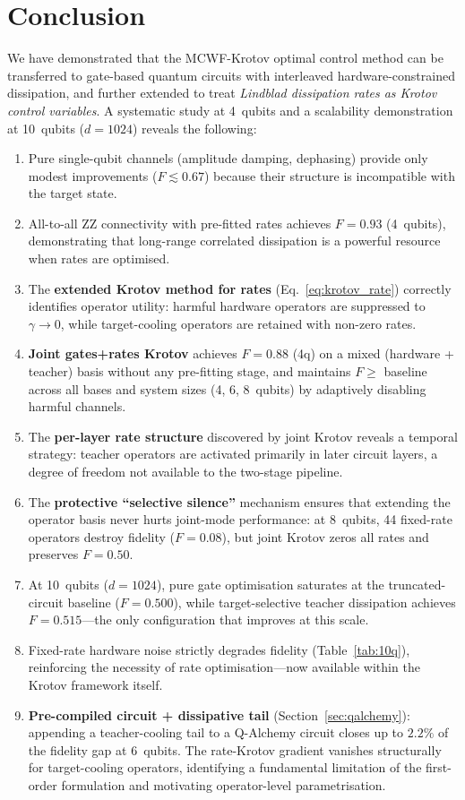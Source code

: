 \documentclass[11pt,a4paper]{article}
\begin{document}
\section{Conclusion}

We have demonstrated that the MCWF-Krotov optimal control method can
be transferred to gate-based quantum circuits with interleaved
hardware-constrained dissipation, and further extended to treat
\emph{Lindblad dissipation rates as Krotov control variables}.
A systematic study at 4~qubits and a scalability demonstration at
10~qubits ($d = 1024$) reveals the following:

\begin{enumerate}[nosep]
\item Pure single-qubit channels (amplitude damping, dephasing) provide
  only modest improvements ($F \lesssim 0.67$) because their structure
  is incompatible with the target state.
\item All-to-all ZZ connectivity with pre-fitted rates achieves
  $F = 0.93$ (4~qubits), demonstrating that long-range correlated
  dissipation is a powerful resource when rates are optimised.
\item The \textbf{extended Krotov method for rates}
  (Eq.~\ref{eq:krotov_rate}) correctly identifies operator utility:
  harmful hardware operators are suppressed to $\gamma \to 0$, while
  target-cooling operators are retained with non-zero rates.
\item \textbf{Joint gates+rates Krotov} achieves $F = 0.88$ (4q) on a
  mixed (hardware + teacher) basis without any pre-fitting stage,
  and maintains $F \ge$ baseline across all bases and system sizes
  (4, 6, 8~qubits) by adaptively disabling harmful channels.
\item The \textbf{per-layer rate structure} discovered by joint
  Krotov reveals a temporal strategy: teacher operators are activated
  primarily in later circuit layers, a degree of freedom not available
  to the two-stage pipeline.
\item The \textbf{protective ``selective silence''} mechanism ensures
  that extending the operator basis never hurts joint-mode
  performance: at 8~qubits, 44 fixed-rate operators destroy
  fidelity ($F = 0.08$), but joint Krotov zeros all rates and
  preserves $F = 0.50$.
\item At 10~qubits ($d = 1024$), pure gate optimisation saturates
  at the truncated-circuit baseline ($F = 0.500$), while
  target-selective teacher dissipation achieves $F = 0.515$---the
  only configuration that improves at this scale.
\item Fixed-rate hardware noise strictly degrades fidelity
  (Table~\ref{tab:10q}), reinforcing the necessity of rate
  optimisation---now available within the Krotov framework itself.
\item \textbf{Pre-compiled circuit + dissipative tail}
  (Section~\ref{sec:qalchemy}): appending a teacher-cooling tail to a
  Q-Alchemy circuit closes up to $2.2\%$ of the fidelity gap at
  6~qubits.  The rate-Krotov gradient vanishes structurally for
  target-cooling operators, identifying a fundamental limitation of the
  first-order formulation and motivating operator-level parametrisation.
\end{enumerate}
\end{document}
